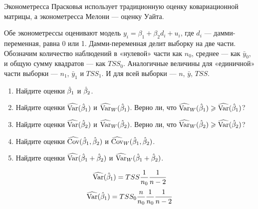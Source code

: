 \begin{problem}
Эконометресса Прасковья использует традиционную оценку ковариационной матрицы, а эконометресса Мелони — оценку Уайта.

Обе эконометрессы оценивают модель $y_i = \beta_1 + \beta_2 d_i + u_i$, где $d_i$ — дамми-переменная, равна 0 или 1. Дамми-переменная делит выборку на две части. Обозначим количество наблюдений в «нулевой» части как $n_0$, среднее — как $\bar y_0$, и общую сумму квадратов — как $TSS_0$. Аналогичные величины для «единичной» части выборки — $n_1$, $\bar y_1$ и $TSS_1$. И для всей выборки — $n$, $\bar y$, $TSS$.


  \begin{enumerate}
    \item Найдите оценки $\hat{\beta}_1$ и $\hat{\beta}_2$.
    \item Найдите оценки $\widehat{\operatorname{Var}}(\hat{\beta}_1)$ и $\widehat{\operatorname{Var}}_W(\hat{\beta}_1)$. Верно ли, что $\widehat{\operatorname{Var}}_W(\hat{\beta}_1) \geqslant \widehat{\operatorname{Var}}(\hat{\beta}_1)$?
    \item Найдите оценки $\widehat{\operatorname{Var}}(\hat{\beta}_2)$ и $\widehat{\operatorname{Var}}_W(\hat{\beta}_2)$. Верно ли, что $\widehat{\operatorname{Var}}_W(\hat{\beta}_2) \geqslant \widehat{\operatorname{Var}}(\hat{\beta}_2)$?
    \item Найдите оценки $\widehat{\operatorname{Cov}}(\hat{\beta}_1, \hat{\beta}_2)$ и $\widehat{\operatorname{Cov}}_W(\hat{\beta}_1, \hat{\beta}_2)$.
    \item Найдите оценки $\widehat{\operatorname{Var}}(\hat{\beta}_1 + \hat{\beta}_2)$ и $\widehat{\operatorname{Var}}_W(\hat{\beta}_1 + \hat{\beta}_2)$.
  \end{enumerate}

\begin{sol}
\[
\widehat{\operatorname{Var}}(\hat{\beta}_1) = TSS \frac{1}{n_0}\frac{1}{n-2}
\]
\[
\widehat{\operatorname{Var}}(\hat{\beta}_1) = TSS_0\frac{n}{n_0} \frac{1}{n_0}\frac{1}{n-2}
\]
\end{sol}
\end{problem}

